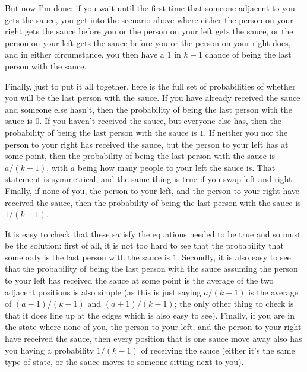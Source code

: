 \documentclass[11pt]{article}
\theoremstyle{definition}
\begin{document}
But now I'm done: if you wait until the first time that someone adjacent to you gets the sauce, you get into the scenario above where either the person on your right gets the sauce before you or the person on your left gets the sauce, or the person on your left gets the sauce before you or the person on your right does, and in either circumstance, you then have a $1$ in $k-1$ chance of being the last person with the sauce.

Finally, just to put it all together, here is the full set of probabilities of whether you will be the last person with the sauce.  If you have already received the sauce and someone else hasn't, then the probability of being the last person with the sauce is $0$.  If you haven't received the sauce, but everyone else has, then the probability of being the last person with the sauce is $1$.  If neither you nor the person to your right has received the sauce, but the person to your left has at some point, then the probability of being the last person with the sauce is $a/(k-1)$, with $a$ being how many people to your left the sauce is.  That statement is symmetrical, and the same thing is true if you swap left and right.  Finally, if none of you, the person to your left, and the person to your right have received the sauce, then the probability of being the last person with the sauce is $1/(k-1)$.

It is easy to check that these satisfy the equations needed to be true and so must be the solution: first of all, it is not too hard to see that the probability that somebody is the last person with the sauce is $1$.  Secondly, it is also easy to see that the probability of being the last person with the sauce assuming the person to your left has received the sauce at some point is the average of the two adjacent positions is also simple (as this is just saying $a/(k-1)$ is the average of $(a-1)/(k-1)$ and $(a+1)/(k-1)$; the only other thing to check is that it does line up at the edges which is also easy to see).  Finally, if you are in the state where none of you, the person to your left, and the person to your right have received the sauce, then every position that is one sauce move away also has you having a probability $1/(k-1)$ of receiving the sauce (either it's the same type of state, or the sauce moves to someone sitting next to you).
\end{document}
